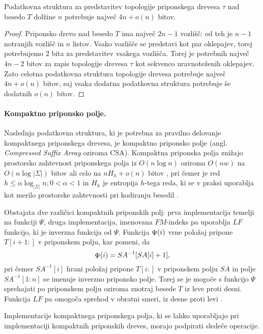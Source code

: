 \begin{lema}\label{lema:BP}
 Podatkovna struktura za predstavitev topologije priponskega drevesa $\tau$ nad besedo $T$ dolžine $n$ potrebuje največ $4n+o(n)$ bitov.
\end{lema}

\begin{proof}
Priponsko drevo nad besedo $T$ ima največ $2n-1$ vozlišč: od teh je $n-1$ notranjih vozlišč in $n$ listov. Vsako vozlišče se predstavi kot par oklepajev, torej potrebujemo 2 bita za predstavitev vsakega vozlišča. Torej je potrebnih največ $4n-2$ bitov za zapis topologije drevesa $\tau$ kot sekvenco uravnoteženih oklepajev. Zato celotna podatkovna struktura topologije drevesa potrebuje največ $4n+o(n)$ bitov, saj vsaka dodatna podatkovna struktura potrebuje še dodatnih $o(n)$ bitov.
\end{proof}

\paragraph{Kompaktno priponsko polje.}
Naslednja podatkovna struktura, ki je potrebna za pravilno delovanje kompaktnega priponskega drevesa, je kompaktno priponsko polje (angl. \textit{Compressed Suffix Array} oziroma CSA). Kompaktna priponska polja znižajo prostorsko zahtevnost priponskega polja iz $O(n\log{n})$ oziroma $O(nw)$ na $O(n\log{|\Sigma|})$ bitov \cite{Grossi2000} ali celo na $nH_h +o(n)$ bitov \cite{Grossi2003}, pri čemer je red $h\le\alpha\log_{|\Sigma|}{n};0<\alpha<1$ in $H_h$ je entropija $h$-tega reda, ki se v praksi uporablja kot merilo prostorske zahtevnosti pri kodiranju besedil \cite{Navarro2016}.

Obstajata dve različici kompaktnih priponskih polj: prva implementacija temelji na funkciji $\Psi$, druga implementacija, imenovana $FM$-indeks pa uporablja $LF$ funkcijo, ki je inverzna funkcija od $\Psi$. Funkcija $ \mathop{\Psi}(i) $ vrne položaj pripone $T[i+1:]$ v priponskem polju, kar pomeni, da
$$
     \mathop{\Psi}(i) =SA^{-1}[SA[i]+1],
$$
pri čemer $SA^{-1}[i]$ hrani položaj pripone $T[i:]$ v priponskem polju $SA$ in polje $SA^{-1}[1:n]$ se imenuje inverzno priponsko polje. Torej se je mogoče s funkcijo $\Psi$ sprehajati po priponskem polju oziroma znotraj besede $T$ iz leve proti desni. Funkcija $LF$ pa omogoča sprehod v obratni smeri, iz desne proti levi \cite{Navarro2016, Sadakane2007}.


Implementacije kompaktnega priponskega polja, ki se lahko uporabljajo pri implementaciji kompaktnih priponskih dreves, morajo podpirati sledeče operacije.

